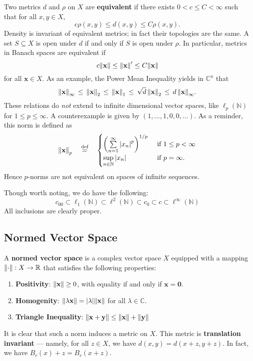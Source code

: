 \documentclass[11pt]{article}
\renewcommand{\vec}[1]{\mathbf{#1}}
\begin{document}
Two metrics $d$ and $\rho$ on $X$ are \textbf{equivalent} if there exists $0 < c \le C < \infty$ such that for all $x, y \in X$,
\[
	c \rho(x, y) \le d(x, y) \le C \rho(x, y).
\]
Density is invariant of equivalent metrics; in fact their topologies are the same. A set $S \subseteq X$ is open under $d$ if and only if $S$ is open under $\rho$. In particular, metrics in Banach spaces are equivalent if
\[
  c \norm{\vec{x}} \le \norm{\vec{x}}' \le C \norm{\vec{x}}
\]
for all $\vec{x} \in X$. As an example, the Power Mean Inequality yields in $\mathbb{C}^{n}$ that
\[
  \norm{\vec{x}}_{\infty} \, \le \, \norm{\vec{x}}_{2} \, \le \, \norm{\vec{x}}_{1} \, \le \, \sqrt{d} \, \norm{\vec{x}}_{2} \, \le \, d \, \norm{\vec{x}}_{\infty}.
\]
These relations do \textit{not} extend to infinite dimensional vector spaces, like $\ell_{p}(\mathbb{N})$ for $1 \le p \le \infty$. A counterexample is given by $(1, \ldots, 1, 0, 0, \ldots)$. As a reminder, this norm is defined as
\[
  \norm{\vec{x}}_{p} \quad \stackrel{\text{def}}{=} \quad  
  \begin{cases}
    \left( \sum\limits_{n = 1}^{\infty} \abs{x_{n}}^{p} \right)^{1/p} & \text{ if } 1 \le p < \infty \\
    \sup\limits_{n \in \mathbb{N}} \abs{x_{n}} & \text{ if } p = \infty.
  \end{cases}
\]
Hence $p$-norms are not equivalent on spaces of infinite sequences.

Though worth noting, we do have the following:
\[
  c_{00} \subset \ell_{1}(\mathbb{N}) \subset \ell^{2}(\mathbb{N}) \subset c_{0} \subset c \subset \ell^{\infty}(\mathbb{N})
\]
All inclusions are clearly proper.


\subsection{Normed Vector Space}

A \textbf{normed vector space} is a complex vector space $X$ equipped with a mapping $\norm{\cdot} : X \to \mathbb{R}$ that satisfies the following properties:
\begin{enumerate}
	\item \textbf{Positivity}: $\norm{\vec{x}} \ge 0$, with equality if and only if $\vec{x} = \vec{0}$.
	\item \textbf{Homogenity}: $\norm{\lambda \vec{x}} = \abs{\lambda} \norm{\vec{x}}$ for all $\lambda \in \mathbb{C}$.
  \item \textbf{Triangle Inequality}: $\norm{\vec{x} + \vec{y}} \le \norm{\vec{x}} + \norm{\vec{y}}$
\end{enumerate}
It is clear that such a norm induces a metric on $X$. This metric is \textbf{translation invariant} --- namely, for all $z \in X$, we have $d(x, y) = d(x + z, y + z)$. In fact, we have $B_{r}(x) + z = B_{r}(x + z)$.
\end{document}
